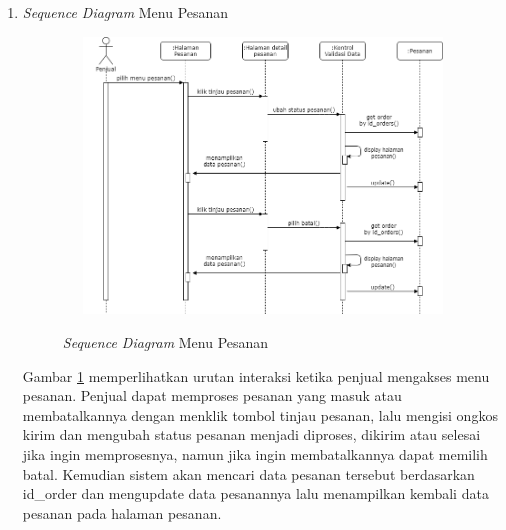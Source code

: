 \begin{enumerate}
	\item \textit{Sequence Diagram} Menu Pesanan
	\begin{figure}[H]
		\centering
		{\includegraphics [width = 12cm, height= 7.35cm]{gambar/sequence/proses pesanan}}
		\caption{\textit{Sequence Diagram} Menu Pesanan}
		\label{seq pesanan}
	\end{figure}
	\par Gambar \ref*{seq pesanan} memperlihatkan urutan interaksi ketika penjual mengakses menu pesanan. Penjual dapat memproses pesanan yang masuk atau membatalkannya dengan menklik tombol tinjau pesanan, lalu mengisi ongkos kirim dan mengubah status pesanan menjadi diproses, dikirim atau selesai jika ingin memprosesnya, namun jika ingin membatalkannya dapat memilih batal. Kemudian sistem akan mencari data pesanan tersebut berdasarkan id\_order dan mengupdate data pesanannya lalu menampilkan kembali data pesanan pada halaman pesanan.


\end{enumerate}
